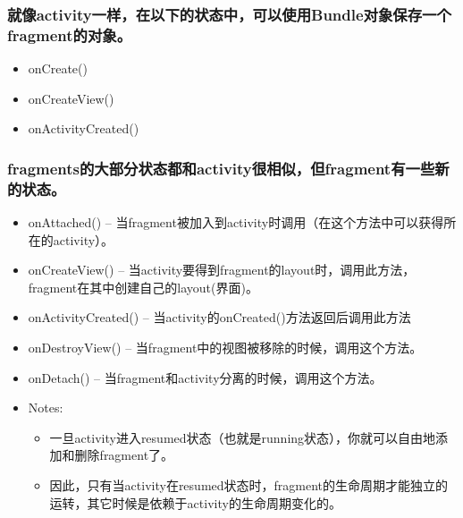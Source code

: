 \documentclass[9pt, b5paper]{article}
\begin{document}
\subsubsection{就像activity一样，在以下的状态中，可以使用Bundle对象保存一个fragment的对象。}
\label{sec-2-1-5}
\begin{itemize}
\item onCreate()
\item onCreateView()
\item onActivityCreated()
\end{itemize}
\subsubsection{fragments的大部分状态都和activity很相似，但fragment有一些新的状态。}
\label{sec-2-1-6}
\begin{itemize}
\item onAttached() -- 当fragment被加入到activity时调用（在这个方法中可以获得所在的activity）。
\item onCreateView() -- 当activity要得到fragment的layout时，调用此方法，fragment在其中创建自己的layout(界面)。
\item onActivityCreated() -- 当activity的onCreated()方法返回后调用此方法
\item onDestroyView() -- 当fragment中的视图被移除的时候，调用这个方法。
\item onDetach() -- 当fragment和activity分离的时候，调用这个方法。
\item Notes:
\begin{itemize}
\item 一旦activity进入resumed状态（也就是running状态），你就可以自由地添加和删除fragment了。
\item 因此，只有当activity在resumed状态时，fragment的生命周期才能独立的运转，其它时候是依赖于activity的生命周期变化的。
\end{itemize}
\end{itemize}
\end{document}

